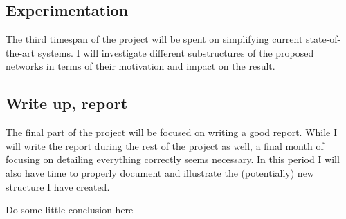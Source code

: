 \documentclass[12pt]{article}
\begin{document}
\subsection{Experimentation}
The third timespan of the project will be spent on simplifying current state-of-the-art systems. I will investigate different substructures of the proposed networks in terms of their motivation and impact on the result. 

\subsection{Write up, report}
The final part of the project will be focused on writing a good report. While I will write the report during the rest of the project as well, a final month of focusing on detailing everything correctly seems necessary. In this period I will also have time to properly document and illustrate the (potentially) new structure I have created.  

Do some little conclusion here






    
\end{document}
